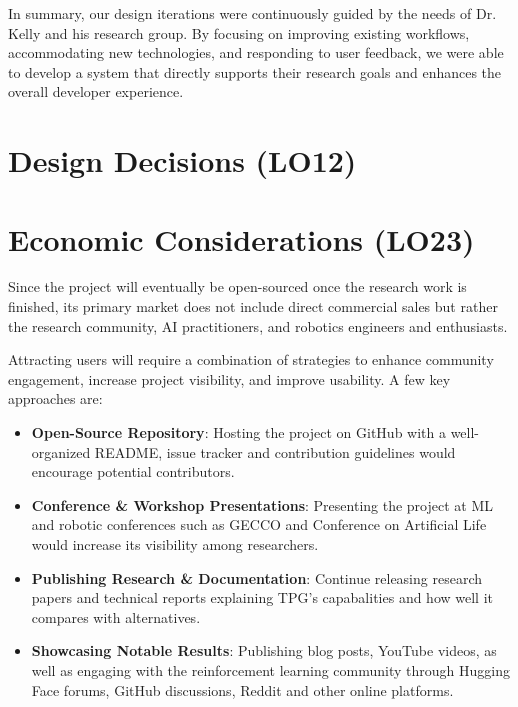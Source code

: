 \documentclass{article}
\begin{document}
In summary, our design iterations were continuously guided by the needs of Dr. Kelly and his research group. By focusing on improving existing workflows, accommodating new technologies, and responding to user feedback, we were able to develop a system that directly supports their research goals and enhances the overall developer experience.


\section{Design Decisions (LO12)}


\section{Economic Considerations (LO23)}

Since the project will eventually be open-sourced once the research work is finished, its primary market does
not include direct commercial sales but rather the research community, AI practitioners, and robotics engineers 
and enthusiasts. 

Attracting users will require a combination of strategies to enhance community engagement,
increase project visibility, and improve usability. A few key approaches are:

\begin{itemize}
    \item \textbf{Open-Source Repository}: Hosting the project on GitHub with a well-organized README, issue tracker and contribution
        guidelines would encourage potential contributors.
    \item \textbf{Conference \& Workshop Presentations}: Presenting the project at ML and robotic conferences such as GECCO and Conference
        on Artificial Life would increase its visibility among researchers.
    \item \textbf{Publishing Research \& Documentation}: Continue releasing research papers and technical reports explaining TPG's 
        capabalities and how well it compares with alternatives.
    \item \textbf{Showcasing Notable Results}: Publishing blog posts, YouTube videos, as well as engaging with the reinforcement learning community
        through Hugging Face forums, GitHub discussions, Reddit and other online platforms. 
\end{itemize}
\end{document}
